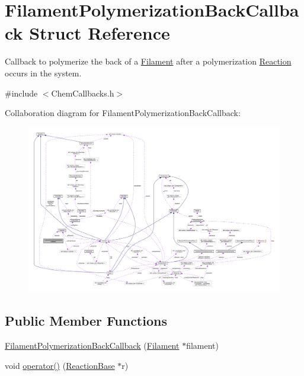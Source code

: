 \hypertarget{structFilamentPolymerizationBackCallback}{\section{Filament\+Polymerization\+Back\+Callback Struct Reference}
\label{structFilamentPolymerizationBackCallback}
}


Callback to polymerize the back of a \hyperlink{classFilament}{Filament} after a polymerization \hyperlink{classReaction}{Reaction} occurs in the system.  




{\ttfamily \#include $<$Chem\+Callbacks.\+h$>$}



Collaboration diagram for Filament\+Polymerization\+Back\+Callback\+:
\nopagebreak
\begin{figure}[H]
\begin{center}
\leavevmode
\includegraphics[width=350pt]{structFilamentPolymerizationBackCallback__coll__graph}
\end{center}
\end{figure}
\subsection*{Public Member Functions}
\begin{DoxyCompactItemize}
\item 
\hyperlink{structFilamentPolymerizationBackCallback_a7a592b0a219ddd5849babba5cf931dc8}{Filament\+Polymerization\+Back\+Callback} (\hyperlink{classFilament}{Filament} $\ast$filament)
\item 
void \hyperlink{structFilamentPolymerizationBackCallback_a1f004e2aa43ac80a0dfea4ec07b511a4}{operator()} (\hyperlink{classReactionBase}{Reaction\+Base} $\ast$r)
\end{DoxyCompactItemize}
